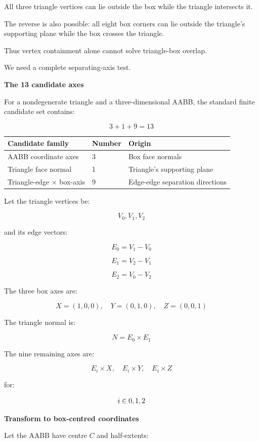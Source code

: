 All three triangle vertices can lie outside the box while the triangle intersects it.

The reverse is also possible: all eight box corners can lie outside the triangle's supporting plane while the box crosses the triangle.

Thus vertex containment alone cannot solve triangle-box overlap.

We need a complete separating-axis test.

\textbf{The 13 candidate axes}

For a nondegenerate triangle and a three-dimensional AABB, the standard finite candidate set contains:

\[
\boxed{ 3+1+9=13 }
\]

{\def\LTcaptype{none} %
\begin{longtable}[]{@{}lll@{}}
\toprule\noalign{}
Candidate family & Number & Origin \\
\midrule\noalign{}
\endhead
\bottomrule\noalign{}
\endlastfoot
AABB coordinate axes & 3 & Box face normals \\
Triangle face normal & 1 & Triangle's supporting plane \\
Triangle-edge × box-axis & 9 & Edge-edge separation directions \\
\end{longtable}
}

Let the triangle vertices be:

\[
V_0,V_1,V_2
\]

and its edge vectors:

\[
E_0=V_1-V_0
\]

\[
E_1=V_2-V_1
\]

\[
E_2=V_0-V_2
\]

The three box axes are:

\[
X=(1,0,0),\quad Y=(0,1,0),\quad Z=(0,0,1)
\]

The triangle normal is:

\[
\boxed{ N=E_0\times E_1 }
\]

The nine remaining axes are:

\[
E_i\times X,\quad E_i\times Y,\quad E_i\times Z
\]

for:

\[
i\in\\{0,1,2\\}
\]

\textbf{Transform to box-centred coordinates}

Let the AABB have centre \(C\) and half-extents:

